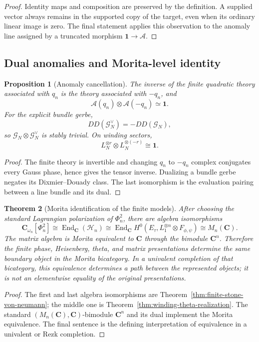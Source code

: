 \documentclass[11pt]{amsart}
\numberwithin{equation}{section}
\newtheorem{theorem}{Theorem}[section]
\newtheorem{proposition}[theorem]{Proposition}
\theoremstyle{definition}
\newcommand{\C}{\mathbf C}
\newcommand{\End}{\operatorname{End}}
\begin{document}
\begin{proof}
Identity maps and composition are preserved by the definition.  A supplied
vector always remains in the supported copy of the target, even when its
ordinary linear image is zero.  The final statement applies this observation
to the anomaly line assigned by a truncated morphism
$\mathbf1\to\mathcal A$.
\end{proof}

\subsection{Dual anomalies and Morita-level identity}

\begin{proposition}[Anomaly cancellation]
\label{prop:anomaly-cancellation}
The inverse of the finite quadratic theory associated with $q_n$ is the
theory associated with $-q_n$, and
\[
\mathcal A(q_n)\otimes\mathcal A(-q_n)\simeq\mathbf1.
\]
For the explicit bundle gerbe,
\[
DD(\mathcal G_N^\vee)=-DD(\mathcal G_N),
\]
so $\mathcal G_N\otimes\mathcal G_N^\vee$ is stably trivial.  On winding
sectors,
\[
L_N^{\otimes r}\otimes L_N^{\otimes(-r)}\cong\mathbf1.
\]
\end{proposition}

\begin{proof}
The finite theory is invertible and changing $q_n$ to $-q_n$ complex
conjugates every Gauss phase, hence gives the tensor inverse.  Dualizing a
bundle gerbe negates its Dixmier--Douady class.  The last isomorphism is the
evaluation pairing between a line bundle and its dual.
\end{proof}

\begin{theorem}[Morita identification of the finite models]
\label{thm:morita-univalent-finite}
After choosing the standard Lagrangian polarization of $\Phi_n^2$, there
are algebra isomorphisms
\[
\C_{\omega_n}[\Phi_n^2]
\cong
\End_\C(\mathscr H_n)
\cong
\End_\C H^0(E_\tau,L_1^{\otimes n}\otimes F_{\phi,\psi})
\cong M_n(\C).
\]
The matrix algebra is Morita equivalent to $\C$ through the bimodule
$\C^n$.  Therefore the finite phase, Heisenberg, theta, and matrix
presentations determine the same boundary object in the Morita bicategory.
In a univalent completion of that bicategory, this equivalence determines
a path between the represented objects; it is not an elementwise equality
of the original presentations.
\end{theorem}

\begin{proof}
The first and last algebra isomorphisms are
Theorem~\ref{thm:finite-stone-von-neumann}; the middle one is
Theorem~\ref{thm:winding-theta-realization}.  The standard
$(M_n(\C),\C)$-bimodule $\C^n$ and its dual implement the Morita
equivalence.  The final sentence is the defining interpretation of
equivalence in a univalent or Rezk completion.
\end{proof}
\end{document}
